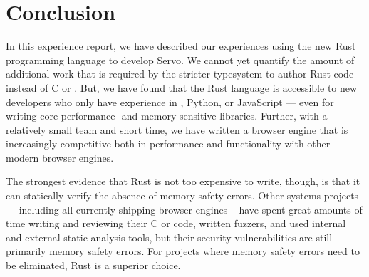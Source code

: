 \section{Conclusion}
\label{sec:concl}
In this experience report, we have described our experiences using the new Rust
programming language to develop Servo.
We cannot yet quantify the amount of additional work that is required by
the stricter typesystem to author Rust code instead of C or \Cplusplus{}.
But, we have found that the Rust language is accessible to new developers who
only have experience in \Cplusplus{}, Python, or JavaScript --- even for writing
core performance- and memory-sensitive libraries.
Further, with a relatively small team and short time, we have written a browser
engine that is increasingly competitive both in performance and functionality
with other modern browser engines.

The strongest evidence that Rust is not too expensive to write, though, is that
it can statically verify the absence of memory safety errors.
Other systems projects --- including all currently shipping browser engines --
have spent great amounts of time writing and reviewing their C or \Cplusplus{}
code, written fuzzers, and used internal and external static analysis tools, but
their security vulnerabilities are still primarily memory safety errors.
For projects where memory safety errors need to be eliminated, Rust is a
superior choice.
